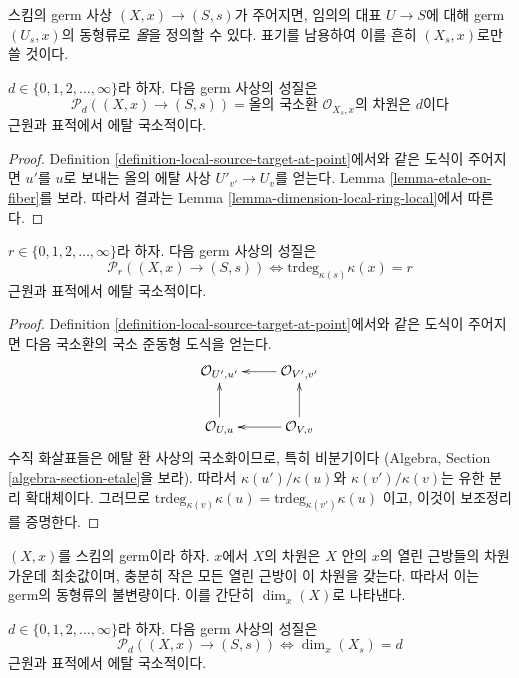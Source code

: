 \noindent
스킴의 germ 사상 $(X, x) \to (S, s)$가 주어지면, 임의의 대표
$U \to S$에 대해 germ $(U_s, x)$의 동형류로 {\it 올}을 정의할 수
있다. 표기를 남용하여 이를 흔히 $(X_s, x)$로만 쓸 것이다.

\begin{lemma}
\label{lemma-dimension-local-ring-fibre}
$d \in \{0, 1, 2, \ldots, \infty\}$라 하자. 다음 germ 사상의 성질은
$$
\mathcal{P}_d((X, x) \to (S, s)) =
\text{올의 국소환 }
\mathcal{O}_{X_s, x}
\text{의 차원은 }d\text{이다}
$$
근원과 표적에서 에탈 국소적이다.
\end{lemma}

\begin{proof}
Definition \ref{definition-local-source-target-at-point}에서와 같은
도식이 주어지면 $u'$를 $u$로 보내는 올의 에탈 사상
$U'_{v'} \to U_v$를 얻는다. Lemma \ref{lemma-etale-on-fiber}를 보라.
따라서 결과는 Lemma \ref{lemma-dimension-local-ring-local}에서 따른다.
\end{proof}

\begin{lemma}
\label{lemma-transcendence-degree-at-point}
$r \in \{0, 1, 2, \ldots, \infty\}$라 하자. 다음 germ 사상의 성질은
$$
\mathcal{P}_r((X, x) \to (S, s))
\Leftrightarrow
\text{trdeg}_{\kappa(s)} \kappa(x) = r
$$
근원과 표적에서 에탈 국소적이다.
\end{lemma}

\begin{proof}
Definition \ref{definition-local-source-target-at-point}에서와 같은
도식이 주어지면 다음 국소환의 국소 준동형 도식을 얻는다.
$$
\xymatrix{
\mathcal{O}_{U', u'} & \mathcal{O}_{V', v'} \ar[l] \\
\mathcal{O}_{U, u} \ar[u] & \mathcal{O}_{V, v} \ar[l] \ar[u]
}
$$
수직 화살표들은 에탈 환 사상의 국소화이므로, 특히 비분기이다
(Algebra, Section \ref{algebra-section-etale}을 보라). 따라서
$\kappa(u')/\kappa(u)$와 $\kappa(v')/\kappa(v)$는 유한 분리
확대체이다. 그러므로
$\text{trdeg}_{\kappa(v)} \kappa(u) = \text{trdeg}_{\kappa(v')} \kappa(u)$
이고, 이것이 보조정리를 증명한다.
\end{proof}

\noindent
$(X, x)$를 스킴의 germ이라 하자. $x$에서 $X$의 차원은 $X$ 안의
$x$의 열린 근방들의 차원 가운데 최솟값이며, 충분히 작은 모든 열린
근방이 이 차원을 갖는다. 따라서 이는 germ의 동형류의 불변량이다.
이를 간단히 $\dim_x(X)$로 나타낸다.

\begin{lemma}
\label{lemma-dimension-at-point}
$d \in \{0, 1, 2, \ldots, \infty\}$라 하자. 다음 germ 사상의 성질은
$$
\mathcal{P}_d((X, x) \to (S, s))
\Leftrightarrow
\dim_x (X_s) = d
$$
근원과 표적에서 에탈 국소적이다.
\end{lemma}

